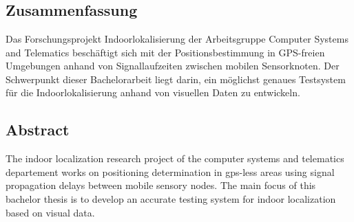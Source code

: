 \chapter*{\abstractname}
\section*{Zusammenfassung}
Das Forschungsprojekt Indoorlokalisierung der Arbeitsgruppe Computer Systems and Telematics beschäftigt sich mit der Positionsbestimmung in GPS-freien Umgebungen anhand von Signallaufzeiten zwischen mobilen Sensorknoten. Der Schwerpunkt dieser Bachelorarbeit liegt darin, ein möglichst genaues Testsystem für die Indoorlokalisierung anhand von visuellen Daten zu entwickeln.

\section*{Abstract}
The indoor localization research project of the computer systems and telematics departement works on positioning determination in gps-less areas using signal propagation delays between mobile sensory nodes. The main focus of this bachelor thesis is to develop an accurate testing system for indoor localization based on visual data.


